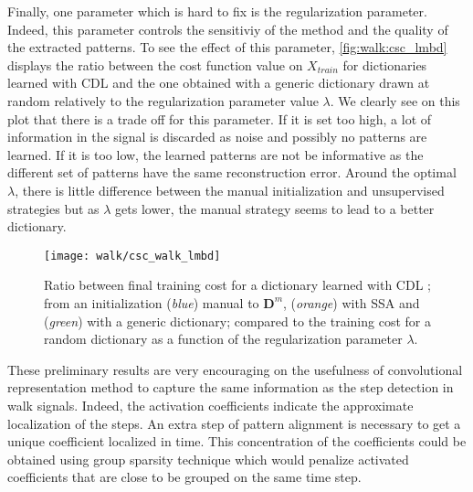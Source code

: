 \documentclass[../thesis.tex]{subfiles}
\begin{document}
{Finally, one parameter which is hard to fix is the regularization parameter. Indeed, this parameter controls the sensitiviy of the method and the quality of the extracted patterns. To see the effect of this parameter, \autoref{fig:walk:csc_lmbd} displays the ratio between the cost function value on $X_{train}$ for dictionaries learned with CDL and the one obtained with a generic dictionary drawn at random relatively to the regularization parameter value $\lambda$. We clearly see on this plot that there is a trade off for this parameter. If it is set too high, a lot of information in the signal is discarded as noise and possibly no patterns are learned. If it is too low, the learned patterns are not be informative as the different set of patterns have the same reconstruction error. Around the optimal $\lambda$, there is little difference between the manual initialization and unsupervised strategies but as $\lambda$ gets lower, the manual strategy seems to lead to a better dictionary.

}



\begin{figure}[htp]
\centering
\texttt{[image: walk/csc\_walk\_lmbd]}
\caption{Ratio between final training cost for a dictionary learned with CDL ; from an initialization (\emph{blue}) manual to $\pmb D^{m}$, (\emph{orange}) with SSA and (\emph{green}) with a generic dictionary; compared to the training cost for a random dictionary as a function of the regularization parameter $\lambda$.}
\label{fig:walk:csc_lmbd}
\end{figure}

These preliminary results are very encouraging on the usefulness of convolutional representation method to capture the same information as the step detection in walk signals. Indeed, the activation coefficients indicate the approximate localization of the steps. An extra step of pattern alignment is necessary to get a unique coefficient localized in time. This concentration of the coefficients could be obtained using group sparsity technique which would penalize activated coefficients that are close to be grouped on the same time step.





\biblio{}
\end{document}
